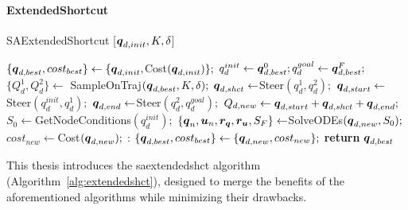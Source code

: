 \paragraph{ExtendedShortcut}

\begin{algorithm}[b!]
    \caption{SAExtendedShortcut [$\boldsymbol{q}_{d,init}, K, \delta$]}\label{alg:extendedshct}
    \begin{algorithmic}[1]
        \State $\{\boldsymbol{q}_{d,best}, cost_{best}\} \gets \{\boldsymbol{q}_{d,init}, $Cost$(\boldsymbol{q}_{d,init})\};$
        \State $q_d^{init} \gets \boldsymbol{q}_{d,best}^0; q_d^{goal} \gets \boldsymbol{q}_{d,best}^F;$
            \State $\{Q_d^{1}, Q_d^{2}\} \gets$ SampleOnTraj$(\boldsymbol{q}_{d,best}, K, \delta);$
                    \State $\boldsymbol{q}_{d,shct} \gets $Steer$(q_d^{1}, q_d^{2});$
                        \State $\boldsymbol{q}_{d,start} \gets $Steer$(q_d^{init}, q_d^{1});$
                        \State $\boldsymbol{q}_{d,end} \gets $Steer$(q_d^{2}, q_d^{goal});$
                        \State $Q_{d,new} \gets \boldsymbol{q}_{d,start}+\boldsymbol{q}_{d,shct}+\boldsymbol{q}_{d,end};$
                    \EndIf
                \EndFor 
            \EndFor
                \State $S_0 \gets $GetNodeConditions$(q_d^{init});$
                \State $\{\boldsymbol{q}_n, \boldsymbol{u}_n, \boldsymbol{r_q}, \boldsymbol{r_u}, S_F\}  \gets $SolveODEs$(\boldsymbol{q}_{d,new}, S_0);$
                \State $cost_{new} \gets $Cost$(\boldsymbol{q}_{d,new});$
                :   
                        \State $\{\boldsymbol{q}_{d,best}, cost_{best}\} \gets \{\boldsymbol{q}_{d,new}, cost_{new}\};$
                    \EndIf
                \EndIf
            \EndFor 
        \EndWhile
    \State \textbf{return} $\boldsymbol{q}_{d,best}$
    \end{algorithmic}
\end{algorithm}

This thesis introduces the \gls{saextendedshct} algorithm (Algorithm~\ref{alg:extendedshct}), designed to merge the benefits of the aforementioned algorithms while minimizing their drawbacks.

